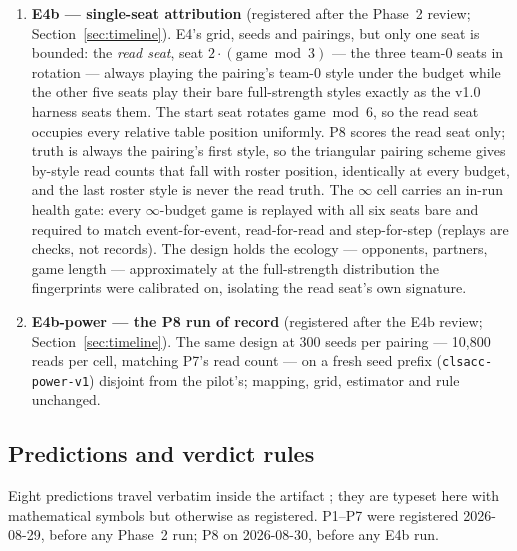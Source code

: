 \documentclass[11pt]{article}
\newcommand{\code}[1]{\texttt{#1}}
\begin{document}
\begin{enumerate}
  bounded at that budget, on the v1.0 accuracy seed list (\code{clsacc-v1}); the
  classifier reads every seat once at end of game against the committed full-strength
  fingerprints \cite{fingerprints} --- 1{,}800 games and 10{,}800 read seats per cell.
  At $\infty$ the arm is decision-identical to the bare styles by the anchor pin, so
  that cell is a re-run of the v1.0 accuracy experiment and must reproduce the committed
  $22.4\%$ exactly.
\item \textbf{E4b --- single-seat attribution} (registered after the Phase~2 review;
  Section~\ref{sec:timeline}). E4's grid, seeds and pairings, but only one seat is
  bounded: the \emph{read seat}, seat $2 \cdot (\text{game} \bmod 3)$ --- the three
  team-0 seats in rotation --- always playing the pairing's team-0 style under the
  budget while the other five seats play their bare full-strength styles exactly as the
  v1.0 harness seats them. The start seat rotates $\text{game} \bmod 6$, so the read
  seat occupies every relative table position uniformly. P8 scores the read seat only;
  truth is always the pairing's first style, so the triangular pairing scheme gives
  by-style read counts that fall with roster position, identically at every budget, and
  the last roster style is never the read truth. The $\infty$ cell carries an in-run
  health gate: every $\infty$-budget game is replayed with all six seats bare and
  required to match event-for-event, read-for-read and step-for-step (replays are
  checks, not records). The design holds the ecology --- opponents, partners, game
  length --- approximately at the full-strength distribution the fingerprints were
  calibrated on, isolating the read seat's own signature.
\item \textbf{E4b-power --- the P8 run of record} (registered after the E4b review;
  Section~\ref{sec:timeline}). The same design at 300 seeds per pairing --- 10{,}800
  reads per cell, matching P7's read count --- on a fresh seed prefix
  (\code{clsacc-power-v1}) disjoint from the pilot's; mapping, grid, estimator and rule
  unchanged.
\end{enumerate}

\subsection{Predictions and verdict rules}
\label{sec:prereg}

Eight predictions travel verbatim inside the artifact \cite{artifact}; they are typeset
here with mathematical symbols but otherwise as registered. P1--P7 were registered
2026-08-29, before any Phase~2 run; P8 on 2026-08-30, before any E4b run.
\end{document}
